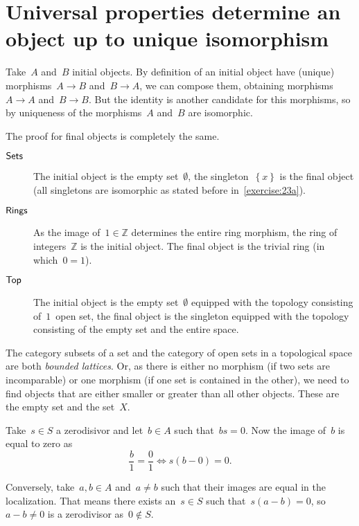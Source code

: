 \section{Universal properties determine an object up to unique isomorphism}

\begin{exercise}
  \label{exercise:23a}
  Take~$A$ and~$B$ initial objects. By definition of an initial object have (unique) morphisms~$A\to B$ and~$B\to A$, we can compose them, obtaining morphisms~$A\to A$ and~$B\to B$. But the identity is another candidate for this morphisms, so by uniqueness of the morphisms~$A$ and~$B$ are isomorphic.

  The proof for final objects is completely the same.
\end{exercise}

\begin{exercise}
  \begin{description}
    \item[$\mathsf{Sets}$] The initial object is the empty set~$\emptyset$, the singleton~$\left\{ x \right\}$ is the final object (all singletons are isomorphic as stated before in~\autoref{exercise:23a}).
    \item[$\mathsf{Rings}$] As the image of~$1\in\mathbb{Z}$ determines the entire ring morphism, the ring of integers~$\mathbb{Z}$ is the initial object. The final object is the trivial ring (in which~$0=1$).
    \item[$\mathsf{Top}$] The initial object is the empty set~$\emptyset$ equipped with the topology consisting of~$1$~open set, the final object is the singleton equipped with the topology consisting of the empty set and the entire space.
  \end{description}

  The category subsets of a set and the category of open sets in a topological space are both \emph{bounded lattices}. Or, as there is either no morphism (if two sets are incomparable) or one morphism (if one set is contained in the other), we need to find objects that are either smaller or greater than all other objects. These are the empty set and the set~$X$.
\end{exercise}

\begin{exercise}
  Take~$s\in S$ a zerodisivor and let~$b\in A$ such that~$bs=0$. Now the image of~$b$ is equal to zero as
  \begin{equation}
    \frac{b}{1}=\frac{0}{1}\Longleftrightarrow s\left( b-0 \right)=0.
  \end{equation}

  Conversely, take~$a,b\in A$ and~$a\neq b$ such that their images are equal in the localization. That means there exists an~$s\in S$ such that~$s(a-b)=0$, so~$a-b\neq 0$ is a zerodivisor as~$0\notin S$.
\end{exercise}

